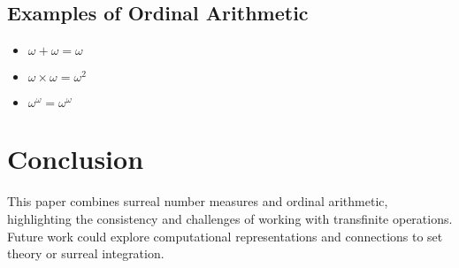 \documentclass[12pt]{article}
\begin{document}
\subsection{Examples of Ordinal Arithmetic}
\begin{itemize}
    \item \( \omega + \omega = \omega \)
    \item \( \omega \times \omega = \omega^2 \)
    \item \( \omega^\omega = \omega^\omega \)
\end{itemize}

\section{Conclusion}
This paper combines surreal number measures and ordinal arithmetic, highlighting the consistency and challenges of working with transfinite operations. Future work could explore computational representations and connections to set theory or surreal integration.
\end{document}
